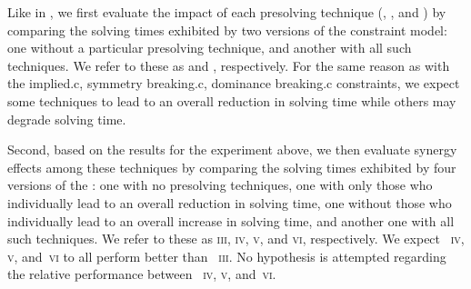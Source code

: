 Like in , we first evaluate the impact of each
\gls{presolving} technique (,
,
and ) by comparing the solving times
exhibited by two versions of the \gls{constraint model}: one without a
particular \gls{presolving} technique, and another with all such techniques.
%
We refer to these  as \modelA{} and \modelB,
respectively.
%
For the same reason as with the \gls{implied.c}, \gls{symmetry breaking.c},
\gls{dominance breaking.c} \glspl{constraint}, we expect some techniques to lead
to an overall reduction in solving time while others may degrade solving time.

\def\modelC{\textsc{iii}}
\def\modelD{\textsc{iv}}
\def\modelE{\textsc{v}}
\def\modelF{\textsc{vi}}

Second, based on the results for the experiment above, we then evaluate synergy
effects among these techniques by comparing the solving times exhibited by four
versions of the : one with no \gls{presolving}
techniques, one with only those who individually lead to an overall reduction in
solving time, one without those who individually lead to an overall increase in
solving time, and another one with all such techniques.
%
We refer to these  as \modelC, \modelD, \modelE,
and \modelF, respectively.
%
We expect ~\modelD, \modelE, and~\modelF{} to all
perform better than ~\modelC.
%
No hypothesis is attempted regarding the relative performance between
~\modelD, \modelE, and~\modelF.



